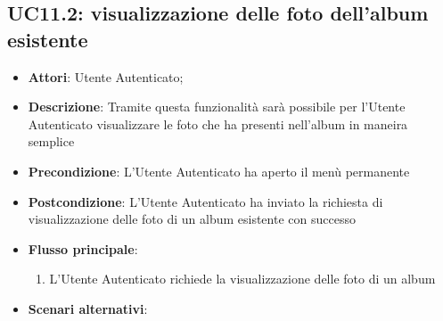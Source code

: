 
\subsection{UC11.2: visualizzazione delle foto dell'album esistente}
\label{uc:uc11.2}

\begin{itemize}
  \item \textbf{Attori}: Utente Autenticato;
  \item \textbf{Descrizione}: Tramite questa funzionalità sarà possibile per
l'Utente Autenticato visualizzare le foto che ha presenti nell'album in maneira
semplice
  \item \textbf{Precondizione}: L'Utente Autenticato ha aperto il menù
permanente
  \item \textbf{Postcondizione}: L'Utente Autenticato ha inviato la richiesta
di visualizzazione delle foto di un album esistente con successo
  \item \textbf{Flusso principale}:
  \begin{enumerate}
    \item L'Utente Autenticato richiede la visualizzazione delle foto di un
album
  \end{enumerate}
  \item \textbf{Scenari alternativi}: %
\end{itemize}




%

%
